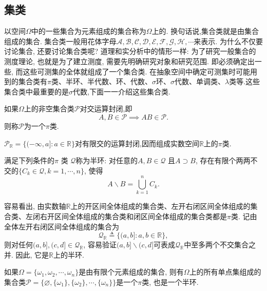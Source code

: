 \subsection{集类}
以空间$\Omega$中的一些集合为元素组成的集合称为$\Omega$上的. 换句话说,集合类就是由集合组成的集合. 集合类一般用花体字母$\mathscr{A},\mathscr{B},\mathscr{C},\mathscr{D},\mathscr{E},\mathscr{F},\mathscr{G},\mathscr{H},\cdots$来表示. 为什么不仅要讨论集合, 还要讨论集合类呢? 道理和实分析中的情形一样: 为了研究一般集合的测度理论, 也就是为了建立测度, 需要先明确研究对象和研究范围. 即必须确定出一些, 而这些可测集的全体就组成了一个集合类. 
在抽象空间中确定可测集时可能用到的集合类有$\pi$类、半环、半代数、环、代数、$\sigma$环、$\sigma$代数、单调类、$\lambda$类等.这些集合类中最重要的是$\sigma$代数,下面一一介绍这些集合类.

\begin{definition}[$\pi$类]
	如果$\Omega$上的非空集合类$\mathscr{P}$对交运算封闭,即\begin{equation}
	A,B\in\mathscr{P} \implies AB\in\mathscr{P}.
	\end{equation} 
	则称$\mathscr{P}$为一个$\pi$类.
\end{definition}
\begin{example}
	$\mathscr{P}_\mathbb{R} = \{(-\infty,a]:a\in\mathbb{R}  \}$对有限交的运算封闭,因而组成实数空间$\mathbb{R}$上的$\pi$类.	
\end{example}
\begin{definition}[半环]
	满足下列条件的$\pi$ 类 $\mathscr{Q}$称为半环: 对任意的$A,B\in\mathscr{Q}$ 且$A\supset B$, 存在有限个两两不交的$\{C_k\in\mathscr{Q},k=1,\cdots,n\}$, 使得
	\begin{equation}
	A\backslash B = \bigcup_{k=1}^nC_k.
	\end{equation}
\end{definition}
\begin{example}
	容易看出, 由实数轴$\mathbb{R}$上的开区间全体组成的集合类、左开右闭区间全体组成的集合类、左闭右开区间全体组成的集合类和闭区间全体组成的集合类都是$\pi$类. 记由全体左开右闭区间全体组成的集合为\begin{equation}
	\mathscr{Q}_{\mathbb{R}} \triangleq \{ (a,b]:a,b\in\mathbb{R} \},
	\end{equation}
	则对任何$(a,b],(c,d]\in\mathscr{Q}_{\mathbb{R}}$, 容易验证$(a,b]\backslash(c,d]$可表成$\mathscr{Q}_{\mathbb{R}}$中至多两个不交集合之并. 因此, 它是$\mathbb{R}$上的半环.
\end{example}
\begin{example}
	如果$\Omega = \{ \omega_1,\omega_2,\cdots,\omega_n \}$是由有限个元素组成的集合, 则有$\Omega$上的所有单点集组成的集合类$\mathscr{P} = \{\varnothing,\{\omega_1\},\{\omega_2\},\cdots,\{\omega_n\}\}$是一个$\pi$类, 也是一个半环.
\end{example}

